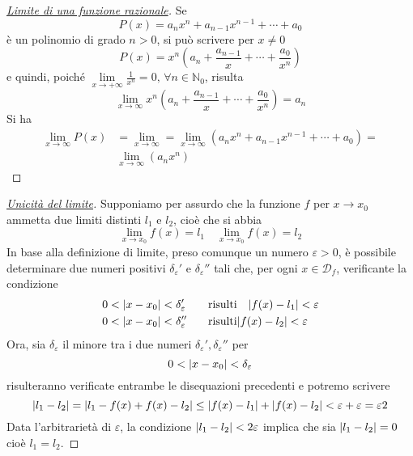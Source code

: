 \begin{proof}
	[\protect\hyperlink{teor:limiteInfinitoFunzRaz}{Limite di una funzione razionale}]
	Se
	\begin{equation*}
	P(x)=a_nx^n+a_{n-1}x^{n-1}+\dotsb+a_0
	\end{equation*}
	è un polinomio di grado $n>0$, si può scrivere per $x\neq0$
	\begin{equation*}
	P(x) = x^n\left(a_n+\frac{a_{n-1}}{x}+\dotsb+\frac{a_0}{x^n}\right)
	\end{equation*}
	e quindi, poiché $\lim\limits_{x\to+\infty}\frac{1}{x^n}=0,\,\forall n\in\mathbb{N}_0$, risulta
	\begin{equation*}
	\lim\limits_{x\to\infty}x^n\left(a_n+\frac{a_{n-1}}{x}+\dotsb+\frac{a_0}{x^n}\right) = a_n
	\end{equation*}
	Si ha
	\begin{align*}
	\lim\limits_{x\to\infty}P(x)&=\lim\limits_{x\to\infty}=
	\lim\limits_{x\to\infty}\left(a_nx^n+a_{n-1}x^{n-1}+\dotsb+a_0\right)=\\
	&\lim\limits_{x\to\infty}\left(a_nx^n\right)
	\end{align*}
\end{proof}

\begin{proof}[\protect\hyperlink{teor:uniLim}{Unicità del limite}]
	Supponiamo per assurdo che la funzione $f$ per $x\to x_0$ ammetta due limiti distinti $l_1$ e 
	$l_2$, cioè che si abbia
	\begin{equation*}
	\lim\limits_{x\to x_0}f(x)=l_1\quad\lim\limits_{x\to x_0}f(x)=l_2
	\end{equation*}
	In base alla definizione di limite, preso comunque un numero $\varepsilon>0$, è possibile 
	determinare due numeri positivi $\delta_\varepsilon'$ e $\delta_\varepsilon''$ tali che, per ogni
	$x\in\mathscr{D}_f$, verificante la condizione
	\begin{align*}
          0&<\lvert x-x_0\rvert<\delta_\varepsilon' \quad&\text{risulti}&\quad\lvert f(x)-l_1\rvert<\varepsilon\\
          0&<\lvert x-x_0\rvert<\delta_\varepsilon'' &\text{risulti}&\lvert f(x)-l_2\rvert<\varepsilon\\
	\end{align*}
	Ora, sia $\delta_\varepsilon$ il minore tra i due numeri $\delta_\varepsilon',\delta_\varepsilon''$
	per
	\begin{equation*}
	0<\lvert x-x_0\rvert<\delta_\varepsilon
	\end{equation*}
	risulteranno verificate entrambe le disequazioni precedenti e potremo scrivere
	\begin{equation*}
	\lvert l_1-l_2\rvert=\lvert l_1-f(x)+f(x)-l_2\rvert\leq\lvert f(x)-l_1\rvert+\lvert f(x)-l_2\rvert<\varepsilon+\varepsilon=
	\varepsilon2
	\end{equation*}
	Data l'arbitrarietà di $\varepsilon$, la condizione $\lvert l_1-l_2\rvert<2\varepsilon$ implica che sia
	$\lvert l_1-l_2\rvert=0$ cioè $l_1=l_2$.
\end{proof}

